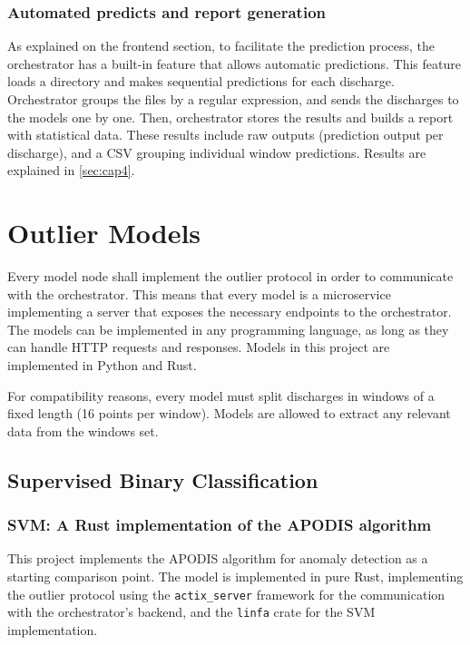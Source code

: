 \subsubsection{Automated predicts and report generation}

As explained on the frontend section, to facilitate the prediction process, the orchestrator has a built-in feature that allows automatic predictions. This feature loads a directory and makes sequential predictions for each discharge. Orchestrator groups the files by a regular expression, and sends the discharges to the models one by one. Then, orchestrator stores the results and builds a report with statistical data. These results include raw outputs (prediction output per discharge), and a CSV grouping individual window predictions. Results are explained in \autoref{sec:cap4}.

\section{Outlier Models}\label{sec:models}

Every model node shall implement the outlier protocol in order to communicate with the orchestrator. This means that every model is a microservice implementing a server that exposes the necessary endpoints to the orchestrator. The models can be implemented in any programming language, as long as they can handle HTTP requests and responses. Models in this project are implemented in Python and Rust.

For compatibility reasons, every model must split discharges in windows of a fixed length (16 points per window). Models are allowed to extract any relevant data from the windows set.

\subsection{Supervised Binary Classification}

\subsubsection{\acs{SVM}: A Rust implementation of the \acs{APODIS} algorithm}\label{sec:svm-implementation}

This project implements the \ac{APODIS} algorithm for anomaly detection as a starting comparison point. The model is implemented in pure Rust, implementing the outlier protocol using the \texttt{actix\_server} framework for the communication with the orchestrator's backend, and the \texttt{linfa} crate for the \ac{SVM} implementation.

